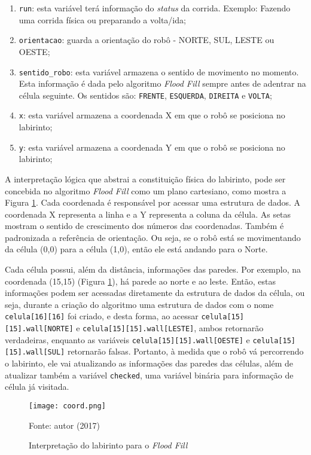 \begin{enumerate}[leftmargin=2cm,label=\alph*)]
\item \verb+run+: esta variável terá informação do \emph{status} da corrida. Exemplo: Fazendo uma corrida física ou preparando a volta/ida;
\item \verb+orientacao+: guarda a orientação do robô - NORTE, SUL, LESTE ou OESTE;
\item \verb+sentido_robo+: esta variável armazena o sentido de movimento no momento. Esta informação é dada pelo algoritmo \emph{Flood Fill} sempre antes de adentrar na célula seguinte. Os sentidos são: \verb+FRENTE+, \verb+ESQUERDA+, \verb+DIREITA+ e \verb+VOLTA+;
\item \verb+x+: esta variável armazena a coordenada X em que o robô se posiciona no labirinto;
\item \verb+y+: esta variável armazena a coordenada Y em que o robô se posiciona no labirinto;
\end{enumerate}

A interpretação lógica que abstrai a constituição física do labirinto, pode ser concebida no algoritmo \emph{Flood Fill} como um plano cartesiano, como mostra a Figura \ref{fig:coord}. Cada coordenada é responsável por acessar uma estrutura de dados. A coordenada X representa a linha e a Y representa a coluna da célula. As setas mostram o sentido de crescimento dos números das coordenadas. Também é padronizada a referência de orientação. Ou seja, se o robô está se movimentando da célula (0,0) para a célula (1,0), então ele está andando para o Norte.


Cada célula possui, além da distância, informações das paredes. Por exemplo, na coordenada (15,15) (Figura \ref{fig:coord}), há parede ao norte e ao leste. Então, estas informações podem ser acessadas diretamente da estrutura de dados da célula, ou seja, durante a criação do algoritmo uma estrutura de dados com o nome \verb+celula[16][16]+ foi criado, e desta forma, ao acessar \verb+celula[15][15].wall[NORTE]+ e \verb+celula[15][15].wall[LESTE]+, ambos retornarão verdadeiras, enquanto as variáveis \verb+celula[15][15].wall[OESTE]+ e \verb+celula[15][15].wall[SUL]+ retornarão falsas. Portanto, à medida que o robô vá percorrendo o labirinto, ele vai atualizando as informações das paredes das células, além de atualizar também a variável \verb+checked+, uma variável binária para informação de célula já visitada.



\begin{figure}[!htb]
	\caption{\label{fig:coord}Interpretação do labirinto para o \emph{Flood Fill}}
	\begin{center}
		\texttt{[image: coord.png]}
	\end{center}
	\centering
	\small Fonte: autor (2017)
\end{figure}


